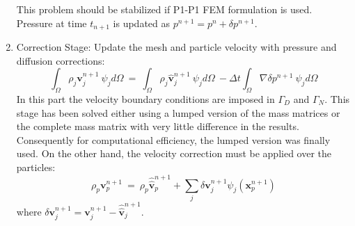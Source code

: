 \begin{enumerate}
 This problem should be stabilized if P1-P1 FEM formulation is used\cite{Idelsohn12b}. Pressure at time $t_{n+1}$ is updated as $p^{n+1}=p^{n}+\delta p^{n+1}$.


 \item Correction Stage: Update the mesh and particle velocity with pressure and diffusion corrections:
 \begin{equation}\label{Step6a}
  \int_{\Omega} \rho_j \mathbf{v}_j^{n+1}\ \psi_j d\Omega \ = \ \int_{\Omega} \rho_j  \widehat{\mathbf{v}}_j^{n+1}\ \psi_j d\Omega\ - \Delta t \int_{\Omega}  \nabla \delta p^{n+1}\ \psi_j d\Omega
 \end{equation}
 In this part the velocity boundary conditions are imposed in $\Gamma_D$ and $\Gamma_N$. This stage has been solved either using a lumped version of the mass matrices or the complete mass matrix with very little difference in the results. Consequently for computational efficiency, the lumped version was finally used. On the other hand, the velocity correction must be applied over the particles:
  \begin{equation}\label{Step6b}
  \rho_p \mathbf{v}_p^{n+1}\  = \ \rho_p \widehat{\widehat{\mathbf{v}}}_p^{n+1} + \sum_{j} \delta \mathbf{v}_j^{n+1} \psi_j(\mathbf{x}_{p}^{n+1})
  \end{equation}
  where $\delta \mathbf{v}_j^{n+1} = \mathbf{v}_j^{n+1}-\widehat{\widehat{\mathbf{v}}}_j^{n+1}$.

\end{enumerate}


